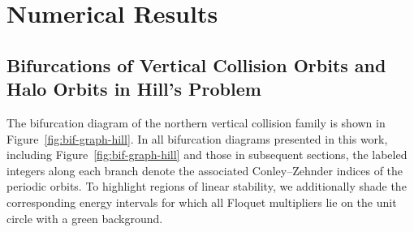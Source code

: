 \documentclass[pdflatex,sn-mathphys-ay]{sn-jnl}%
\theoremstyle{thmstyleone}%
\theoremstyle{thmstyletwo}%
\theoremstyle{thmstylethree}%
\begin{document}
\section{Numerical Results}
\label{sec:numerical-work}

\subsection{Bifurcations of Vertical Collision Orbits and Halo Orbits in Hill's Problem}
\label{sec:bif-hill}

The bifurcation diagram of the northern vertical collision family is shown in Figure~\ref{fig:bif-graph-hill}.
In all bifurcation diagrams presented in this work, including Figure~\ref{fig:bif-graph-hill} and those in subsequent sections, the labeled integers along each branch denote the associated Conley--Zehnder indices of the periodic orbits. 
To highlight regions of linear stability, we additionally shade the corresponding energy intervals for which all Floquet multipliers lie on the unit circle with a green background. 
\end{document}
